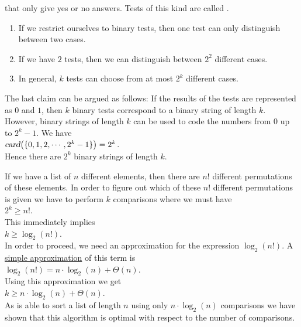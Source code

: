that only give yes or no answers.  Tests of this kind are called .
\begin{enumerate}
\item If we restrict ourselves to binary tests, then one test can only distinguish between two cases.
\item If we have $2$ tests, then we can distinguish between  $2^2$ different cases.
\item In general, $k$ tests can choose from at most $2^k$ different cases.
\end{enumerate}
The last claim can be argued as follows:  If the results of the tests are represented as
$0$ and $1$, then $k$ binary tests correspond to a binary string of length
$k$.  However, binary strings of length $k$ can be used to code the numbers from $0$ up to
$2^{k}-1$.  We have
\\[0.2cm]
\hspace*{1.3cm}
$\textsl{card}\bigl(\{0,1,2,\cdots, 2^k-1\}\bigr) = 2^k$.
\\[0.2cm]
Hence there are $2^k$ binary strings of length $k$.  

If we have a list of $n$ different elements, then there are $n!$ different permutations of these
elements.  In order to figure out which of these $n!$ different permutations is given we have to
perform $k$ comparisons where we must have
\\[0.2cm]
\hspace*{1.3cm}
$2^k \geq n!$.
\\[0.2cm]
This immediately implies
\\[0.2cm]
\hspace*{1.3cm}
$k \geq \log_2(n!)$.
\\[0.2cm]
In order to proceed, we need an approximation for the expression $\log_2(n!)$.  
A \href{http://en.wikipedia.org/wiki/Stirling's_approximation}{simple approximation} of this term is
\\[0.2cm]
\hspace*{1.3cm}
$\log_2(n!) = n \cdot \log_2(n) + \Theta(n)$.
\\[0.2cm]
Using this approximation we get
\\[0.2cm]
\hspace*{1.3cm}
$k \geq n \cdot \log_2(n) + \Theta(n)$.
\\[0.2cm]
As  is able to sort a list of length $n$ using only $n \cdot \log_2(n)$ comparisons
we have shown that this algorithm is optimal with respect to the number of comparisons.

